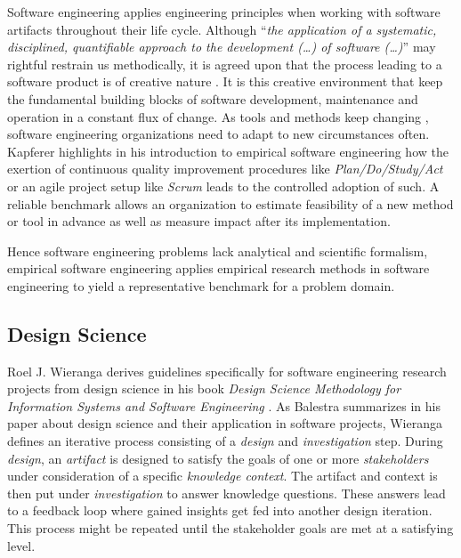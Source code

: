 \documentclass[12pt,a4paper]{article}
\begin{document}
Software engineering applies engineering principles when working with software artifacts \cite{159342} throughout their life cycle. Although ``\emph{the application of a systematic, disciplined, quantifiable approach to the development (\dots) of software (\dots)}'' \cite{159342} may rightful restrain us methodically, it is agreed upon that the process leading to a software product is of creative nature \cite{8051350}. It is this creative environment that keep the fundamental building blocks of software development, maintenance and operation in a constant flux of change. As tools and methods keep changing \cite{kapferer:2019:empirical}, software engineering organizations need to adapt to new circumstances often. Kapferer \cite{kapferer:2019:empirical} highlights in his introduction to empirical software engineering how the exertion of continuous quality improvement procedures like \emph{Plan/Do/Study/Act} \cite{deming} or an agile project setup like \emph{Scrum} leads to the controlled adoption of such. A reliable benchmark allows an organization to estimate feasibility of a new method or tool in advance as well as measure impact after its implementation.

Hence software engineering problems lack analytical and scientific formalism, empirical software engineering applies empirical research methods in software engineering to yield a representative benchmark for a problem domain.

\subsection{Design Science}

Roel J. Wieranga derives guidelines specifically for software engineering research projects from design science in his book \emph{Design Science Methodology for Information Systems and Software Engineering} \cite{wieringa}. As Balestra \cite{balestra:2019:designscience:articactandcontext} summarizes in his paper about design science and their application in software projects, Wieranga \cite{wieringa} defines an iterative process consisting of a \emph{design} and \emph{investigation} step. During \emph{design}, an \emph{artifact} is designed to satisfy the goals of one or more \emph{stakeholders} under consideration of a specific \emph{knowledge context}. The artifact and context is then put under \emph{investigation} to answer knowledge questions. These answers lead to a feedback loop where gained insights get fed into another design iteration. This process might be repeated until the stakeholder goals are met at a satisfying level.
\end{document}
